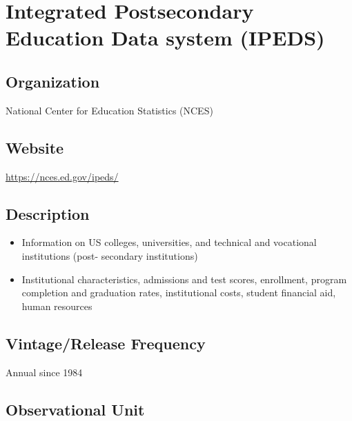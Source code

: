 \documentclass[
]{book}
\providecommand{\tightlist}{%
  \setlength{\itemsep}{0pt}\setlength{\parskip}{0pt}}
\begin{document}
\hypertarget{integrated-postsecondary-education-data-system-ipeds}{%
\chapter{Integrated Postsecondary Education Data system (IPEDS)}\label{integrated-postsecondary-education-data-system-ipeds}}

\hypertarget{organization-33}{%
\section{Organization}\label{organization-33}}

National Center for Education Statistics (NCES)

\hypertarget{website-33}{%
\section{Website}\label{website-33}}

\url{https://nces.ed.gov/ipeds/}

\hypertarget{description-33}{%
\section{Description}\label{description-33}}

\begin{itemize}
\tightlist
\item
  Information on US colleges, universities, and technical and vocational institutions (post- secondary institutions)
\item
  Institutional characteristics, admissions and test scores, enrollment, program completion and graduation rates, institutional costs, student financial aid, human resources
\end{itemize}

\hypertarget{vintagerelease-frequency-33}{%
\section{Vintage/Release Frequency}\label{vintagerelease-frequency-33}}

Annual since 1984

\hypertarget{observational-unit-33}{%
\section{Observational Unit}\label{observational-unit-33}}
\end{document}
